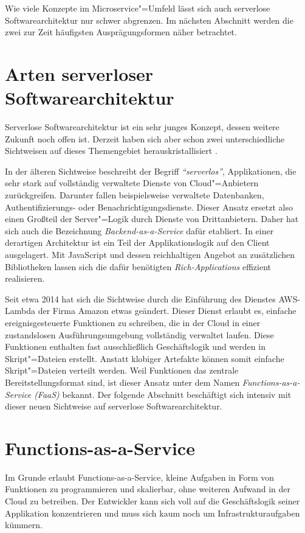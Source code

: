 Wie viele Konzepte im Microservice"=Umfeld lässt sich auch serverlose Softwarearchitektur nur schwer abgrenzen. Im nächsten Abschnitt werden die zwei zur Zeit häufigsten Ausprägungsformen näher betrachtet.

\section{Arten serverloser Softwarearchitektur}

Serverlose Softwarearchitektur ist ein sehr junges Konzept, dessen weitere Zukunft noch offen ist. Derzeit haben sich aber schon zwei unterschiedliche Sichtweisen auf dieses Themengebiet herauskristallisiert \cite{ServerlessArchitectures}.

In der älteren Sichtweise beschreibt der Begriff \textit{"`serverlos"'}, Applikationen, die sehr stark auf vollständig verwaltete Dienste von Cloud"=Anbietern zurückgreifen. Darunter fallen beispielsweise verwaltete Datenbanken, Authentifizierungs- oder Benachrichtigungsdienste. Dieser Ansatz ersetzt also einen Großteil der Server"=Logik durch Dienste von Drittanbietern. Daher hat sich auch die Bezeichnung \textit{Backend-as-a-Service} dafür etabliert. In einer derartigen Architektur ist ein Teil der Applikationslogik auf den Client ausgelagert. Mit JavaScript und dessen reichhaltigen Angebot an zusätzlichen Bibliotheken lassen sich die dafür benötigten \textit{Rich-Applications} effizient realisieren.

Seit etwa 2014 hat sich die Sichtweise durch die Einführung des Dienstes AWS-Lambda der Firma Amazon etwas geändert. Dieser Dienst erlaubt es, einfache ereignisgesteuerte Funktionen zu schreiben, die in der Cloud in einer zustandslosen Ausführungsumgebung vollständig verwaltet laufen. Diese Funktionen enthalten fast ausschließlich Geschäftslogik und werden in Skript"=Dateien erstellt. Anstatt klobiger Artefakte können somit einfache Skript"=Dateien verteilt werden. Weil Funktionen das zentrale Bereitstellungsformat sind, ist dieser Ansatz unter dem Namen \textit{Functions-as-a-Service (FaaS)} bekannt. Der folgende Abschnitt beschäftigt sich intensiv mit dieser neuen Sichtweise auf serverlose Softwarearchitektur.

\section{Functions-as-a-Service}

Im Grunde erlaubt Functions-as-a-Service, kleine Aufgaben in Form von Funktionen zu programmieren und skalierbar, ohne weiteren Aufwand in der Cloud zu betreiben. Der Entwickler kann sich voll auf die Geschäftslogik seiner Applikation konzentrieren und muss sich kaum noch um Infrastrukturaufgaben kümmern.

